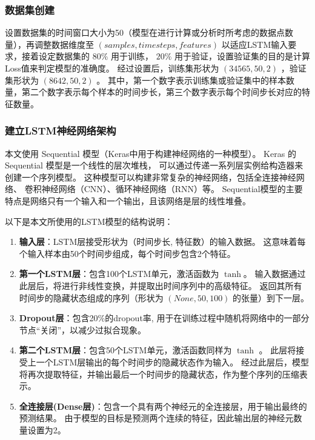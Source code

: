\documentclass[withoutpreface,bwprint]{cumcmthesis}  %
\begin{document}
        \subsubsection{数据集创建}
                设置数据集的时间窗口大小为50（模型在进行计算或分析时所考虑的数据点数量），再调整数据维度至 $(samples, time steps, features)$ 以适应LSTM输入要求，接着设定数据集的 $80\%$ 用于训练， $20\%$ 用于验证，设置验证集的目的是计算Loss值来判定模型的准确度。
                经过设置后，训练集形状为 $(34565, 50, 2)$ ，验证集形状为 $(8642, 50, 2)$ 。
                其中，第一个数字表示训练集或验证集中的样本数量，第二个数字表示每个样本的时间步长，第三个数字表示每个时间步长对应的特征数量。
                
        \subsubsection{建立LSTM神经网络架构}
        本文使用 Sequential 模型（Keras中用于构建神经网络的一种模型）。
        Keras 的 Sequential 模型是一个线性的层次堆栈，
        可以通过传递一系列层实例给构造器来创建一个序列模型。
        这种模型可以构建非常复杂的神经网络，包括全连接神经网络、
        卷积神经网络（CNN）、循环神经网络（RNN）等。
        Sequential模型的主要特点是网络只有一个输入和一个输出，且该网络是层的线性堆叠。

        以下是本文所使用的LSTM模型的结构说明：
            \begin{enumerate}
                \item \textbf{输入层}：LSTM层接受形状为（时间步长, 特征数）的输入数据。
                        这意味着每个输入样本由50个时间步组成，每个时间步包含2个特征。
                \item \textbf{第一个LSTM层}：包含100个LSTM单元，激活函数为 $\tanh$。
                        输入数据通过此层后，将进行非线性变换，并提取出时间序列中的高级特征。
                        返回其所有时间步的隐藏状态组成的序列（形状为 $(None, 50, 100)$ 的张量）到下一层。
                \item \textbf{Dropout层}：包含20\%的dropout率,
                        用于在训练过程中随机将网络中的一部分节点“关闭”，以减少过拟合现象。
                \item \textbf{第二个LSTM层}：包含50个LSTM单元，激活函数同样为 $\tanh$ 。
                        此层将接受上一个LSTM层输出的每个时间步的隐藏状态作为输入。
                        经过此层后，模型将再次提取特征，并输出最后一个时间步的隐藏状态，作为整个序列的压缩表示。
                \item \textbf{全连接层(Dense层)}：包含一个具有两个神经元的全连接层，用于输出最终的预测结果。
                        由于模型的目标是预测两个连续的特征，因此输出层的神经元数量设置为2。
            \end{enumerate}
\end{document}
